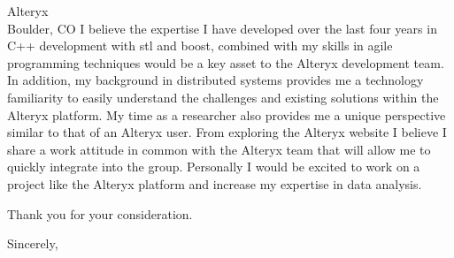 \documentclass{letter}
\begin{document}
\begin{letter}{Alteryx\\Boulder, CO}
I believe the expertise I have developed over the last four years
in C++ development with stl and boost, combined with my skills in
agile programming techniques would be a key asset to the Alteryx
development team.  In addition, my background in distributed systems
provides me a technology familiarity to easily understand the
challenges and existing solutions within the Alteryx platform.  My
time as a researcher also provides me a unique perspective similar
to that of an Alteryx user.  From exploring the Alteryx website I
believe I share a work attitude in common with the Alteryx team
that will allow me to quickly integrate into the group.  Personally
I would be excited to work on a project like the Alteryx platform
and increase my expertise in data analysis.

Thank you for your consideration.

\closing{Sincerely,}
\end{letter}
\end{document}
